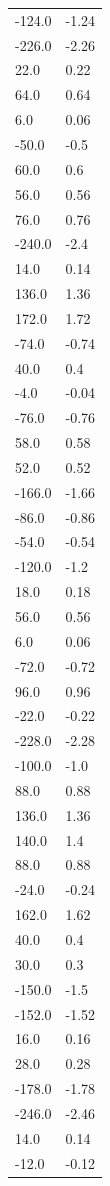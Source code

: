 \begin{longtable}{ll}
-124.0 & -1.24 \\
-226.0 & -2.26 \\
22.0 & 0.22 \\
64.0 & 0.64 \\
6.0 & 0.06 \\
-50.0 & -0.5 \\
60.0 & 0.6 \\
56.0 & 0.56 \\
76.0 & 0.76 \\
-240.0 & -2.4 \\
14.0 & 0.14 \\
136.0 & 1.36 \\
172.0 & 1.72 \\
-74.0 & -0.74 \\
40.0 & 0.4 \\
-4.0 & -0.04 \\
-76.0 & -0.76 \\
58.0 & 0.58 \\
52.0 & 0.52 \\
-166.0 & -1.66 \\
-86.0 & -0.86 \\
-54.0 & -0.54 \\
-120.0 & -1.2 \\
18.0 & 0.18 \\
56.0 & 0.56 \\
6.0 & 0.06 \\
-72.0 & -0.72 \\
96.0 & 0.96 \\
-22.0 & -0.22 \\
-228.0 & -2.28 \\
-100.0 & -1.0 \\
88.0 & 0.88 \\
136.0 & 1.36 \\
140.0 & 1.4 \\
88.0 & 0.88 \\
-24.0 & -0.24 \\
162.0 & 1.62 \\
40.0 & 0.4 \\
30.0 & 0.3 \\
-150.0 & -1.5 \\
-152.0 & -1.52 \\
16.0 & 0.16 \\
28.0 & 0.28 \\
-178.0 & -1.78 \\
-246.0 & -2.46 \\
14.0 & 0.14 \\
-12.0 & -0.12 \\

\end{longtable}
